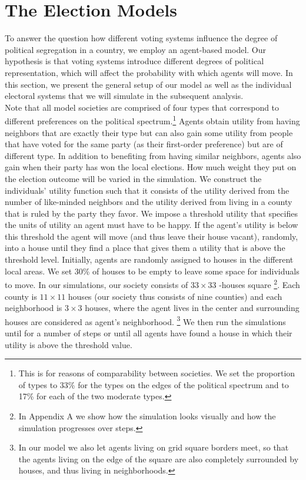 \documentclass[12pt, a4paper]{article}
\begin{document}
	\section{\label{model}The Election Models}
	To answer the question how different voting systems influence the degree of political segregation in a country, we employ an agent-based model. Our hypothesis is that voting systems introduce different degrees of political representation, which will affect the probability with which agents will move. In this section, we present the general setup of our model as well as the individual electoral systems that we will simulate in the subsequent analysis.\\%
	Note that all model societies are comprised of four types that correspond to different preferences on the political spectrum.\footnote{This is for reasons of comparability between societies. We set the proportion of types to 33\% for the types on the edges of the political spectrum and to 17\% for each of the two moderate types.} Agents obtain utility from having neighbors that are exactly their type but can also gain some utility from people that have voted for the same party (as their first-order preference) but are of different type. In addition to benefiting from having similar neighbors, agents also gain when their party has won the local elections. How much weight they put on the election outcome will be varied in the simulation.
	We construct the individuals' utility function such that it consists of the utility derived from the number of like-minded neighbors and the utility derived from living in a county that is ruled by the party they favor.
	We impose a threshold utility that specifies the units of utility an agent must have to be happy. If the agent's utility is below this threshold the agent will move (and thus leave their house vacant), randomly, into a house until they find a place that gives them a utility that is above the threshold level. Initially, agents are randomly assigned to houses in the different local areas. We set 30\% of houses to be empty to leave some space for individuals to move.
	In our simulations, our society consists of $33\times33$ -houses square \footnote{In Appendix A we show how the simulation looks visually and how the simulation progresses over steps.}. Each county is $11\times11$ houses (our society thus consists of nine counties) and each neighborhood is $3\times3$ houses, where the agent lives in the center and surrounding houses are considered as agent's neighborhood. \footnote{In our model we also let agents living on grid square borders meet, so that the agents living on the edge of the square are also completely surrounded by houses, and thus living in neighborhoods.}
	We then run the simulations until for a number of steps or until all agents have found a house in which their utility is above the threshold value.
	
\end{document}
